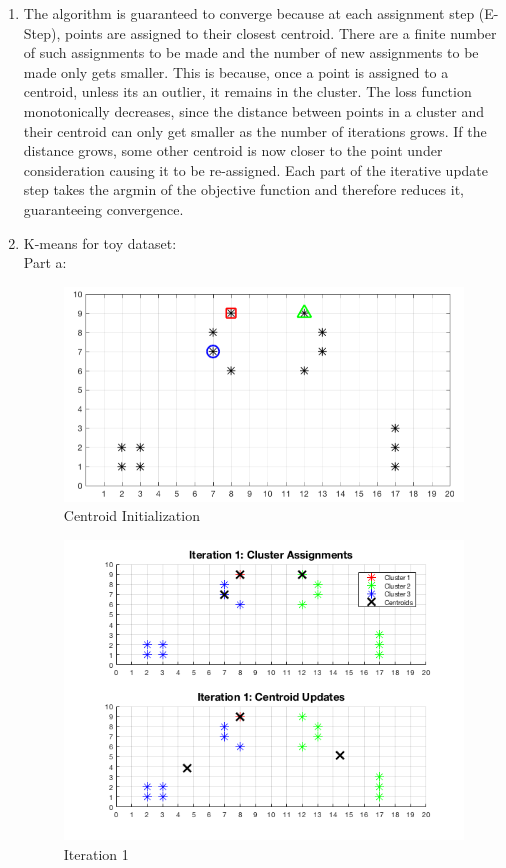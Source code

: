 \documentclass[english]{article}
\begin{document}
\begin{enumerate}
    \item The algorithm is guaranteed to converge because at each assignment step (E-Step), points are assigned to their closest centroid. There are a finite number of such assignments to be made and the number of new assignments to be made only gets smaller. This is because, once a point is assigned to a centroid, unless its an outlier, it remains in the cluster. The loss function monotonically decreases, since the distance between points in a cluster and their centroid can only get smaller as the number of iterations grows. If the distance grows, some other centroid is now closer to the point under consideration causing it to be re-assigned. Each part of the iterative update step takes the argmin of the objective function and therefore reduces it, guaranteeing convergence.
    
    \item K-means for toy dataset: \\
    Part a:
    
    \begin{figure}[H]
    \centering
    \includegraphics[scale = 0.5]{init_a}
    \caption{Centroid Initialization}
    \label{fig:init_a}
    \end{figure}
    
    \begin{figure}[H]
    \centering
    \includegraphics[scale = 0.85]{iter1_a}
    \caption{Iteration 1}
    \label{fig:iter1_a}
    \end{figure}
    

\end{enumerate}
\end{document}

